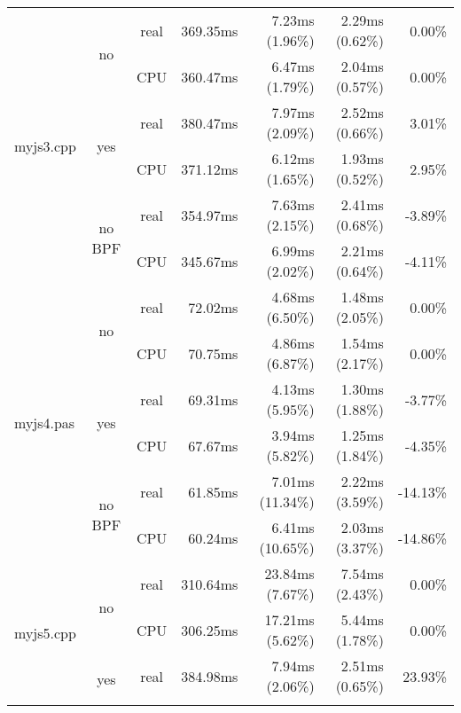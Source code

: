 \documentclass[en]{pracamgr}
\begin{document}
\begin{appendices}
\begin{small}
\begin{longtable}{|l|c|c|r|r|r|r|}
\hline
\multirow{6}{*}{myjs3.cpp}  & \multirow{2}{*}{no}     & real & 369.35ms & 7.23ms (1.96\%) & 2.29ms (0.62\%) & 0.00\% \\*
                            &                         & CPU  & 360.47ms & 6.47ms (1.79\%) & 2.04ms (0.57\%) & 0.00\% \\*
                            \cline{2-7}
                            & \multirow{2}{*}{yes}    & real & 380.47ms & 7.97ms (2.09\%) & 2.52ms (0.66\%) & 3.01\% \\*
                            &                         & CPU  & 371.12ms & 6.12ms (1.65\%) & 1.93ms (0.52\%) & 2.95\% \\*
                            \cline{2-7}
                            & \multirow{2}{*}{no BPF} & real & 354.97ms & 7.63ms (2.15\%) & 2.41ms (0.68\%) & -3.89\% \\*
                            &                         & CPU  & 345.67ms & 6.99ms (2.02\%) & 2.21ms (0.64\%) & -4.11\% \\
\hline
\multirow{6}{*}{myjs4.pas}  & \multirow{2}{*}{no}     & real & 72.02ms & 4.68ms (6.50\%) & 1.48ms (2.05\%) & 0.00\% \\*
                            &                         & CPU  & 70.75ms & 4.86ms (6.87\%) & 1.54ms (2.17\%) & 0.00\% \\*
                            \cline{2-7}
                            & \multirow{2}{*}{yes}    & real & 69.31ms & 4.13ms (5.95\%) & 1.30ms (1.88\%) & -3.77\% \\*
                            &                         & CPU  & 67.67ms & 3.94ms (5.82\%) & 1.25ms (1.84\%) & -4.35\% \\*
                            \cline{2-7}
                            & \multirow{2}{*}{no BPF} & real & 61.85ms & 7.01ms (11.34\%) & 2.22ms (3.59\%) & -14.13\% \\*
                            &                         & CPU  & 60.24ms & 6.41ms (10.65\%) & 2.03ms (3.37\%) & -14.86\% \\
\hline
\multirow{6}{*}{myjs5.cpp}  & \multirow{2}{*}{no}     & real & 310.64ms & 23.84ms (7.67\%) & 7.54ms (2.43\%) & 0.00\% \\*
                            &                         & CPU  & 306.25ms & 17.21ms (5.62\%) & 5.44ms (1.78\%) & 0.00\% \\*
                            \cline{2-7}
                            & \multirow{2}{*}{yes}    & real & 384.98ms & 7.94ms (2.06\%) & 2.51ms (0.65\%) & 23.93\% \\*

\end{longtable}
\end{small}
\end{appendices}
\end{document}
